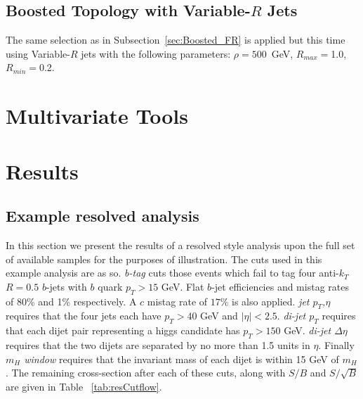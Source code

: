 \documentclass[12pt]{article}
\begin{document}
\subsection{Boosted Topology with Variable-$R$ Jets}

The same selection as in Subsection~\ref{sec:Boosted_FR} is applied but this time using Variable-$R$ jets with the following parameters:
$\rho=500$~GeV, $R_{max}=$1.0, $R_{min}=$0.2.

\section{Multivariate Tools}

\clearpage
\section{Results}
\subsection{Example resolved analysis}
In this section we present the results of a resolved style analysis upon the full set of available samples for the purposes of illustration. The cuts used in this example analysis are as so. \emph{b-tag} cuts those events which fail to tag four anti-$k_T$ $R=0.5$ $b$-jets with $b$ quark $p_T > 15$ GeV. Flat $b$-jet efficiencies and mistag rates of 80\% and 1\% respectively. A $c$ mistag rate of $17\%$ is also applied.  \emph{jet $p_T$,$\eta$} requires that the four jets each have $p_T>40$ GeV and $|\eta|< 2.5$. \emph{di-jet $p_T$} requires that each dijet pair representing a higgs candidate has $p_T>150 $ GeV. \emph{di-jet $\Delta\eta$} requires that the two dijets are separated by no more than 1.5 units in $\eta$. Finally \emph{$m_H$ window} requires that the invariant mass of each dijet is within 15 GeV of $m_H$. The remaining cross-section after each of these cuts, along with $S/B$ and $S/\sqrt{B}$ are given in Table ~\ref{tab:resCutflow}.
\end{document}

